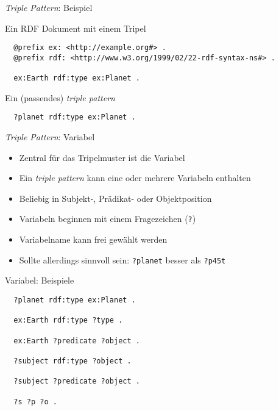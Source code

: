 \documentclass{beamer}
\begin{document}
\begin{frame}[fragile]{\emph{Triple Pattern}: Beispiel}
	
	Ein RDF Dokument mit einem Tripel
	\vspace{0.5cm}
	\small
	\begin{lstlisting}
  @prefix ex: <http://example.org#> .
  @prefix rdf: <http://www.w3.org/1999/02/22-rdf-syntax-ns#> .
  
  ex:Earth rdf:type ex:Planet .
	\end{lstlisting}
	\vspace{1cm}\normalsize
	Ein (passendes) \emph{triple pattern}
	\vspace{0.5cm}
	\small
	\begin{lstlisting}		
  ?planet rdf:type ex:Planet .
	\end{lstlisting}
	
\end{frame}

\begin{frame}{\emph{Triple Pattern}: Variabel}
	
	\begin{itemize}
		\item Zentral für das Tripelmuster ist die Variabel
		\item Ein \emph{triple pattern} kann eine oder mehrere Variabeln enthalten
		\item Beliebig in Subjekt-, Prädikat- oder Objektposition
		\item Variabeln beginnen mit einem Fragezeichen (\texttt{?})
		\item Variabelname kann frei gewählt werden
		\item Sollte allerdings sinnvoll sein: \texttt{?planet} besser als \texttt{?p45t}
	\end{itemize}
	
\end{frame}

\begin{frame}[fragile]{Variabel: Beispiele}
	
	\small
	\begin{lstlisting}		
  ?planet rdf:type ex:Planet .
  
  ex:Earth rdf:type ?type .
  
  ex:Earth ?predicate ?object .
  
  ?subject rdf:type ?object .
  
  ?subject ?predicate ?object .
  
  ?s ?p ?o .
	\end{lstlisting}
	
\end{frame}
\end{document}
